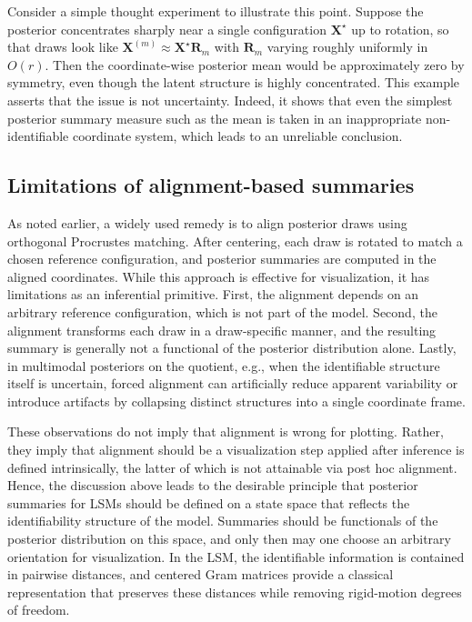 \documentclass[12pt]{article}
\newcommand{\bfR}{\boldsymbol{R}}
\newcommand{\bfX}{\boldsymbol{X}}
\begin{document}
Consider a simple thought experiment to illustrate this point. Suppose the posterior concentrates sharply near a
single configuration $\bfX^\star$ up to rotation, so that draws look like $\bfX^{(m)}\approx \bfX^\star \bfR_m$
with $\bfR_m$ varying roughly uniformly in $O(r)$. Then the coordinate-wise posterior mean would be approximately zero by symmetry, even though the latent structure is highly concentrated. This example asserts that the issue is not uncertainty. Indeed, it shows that even the simplest posterior summary measure such as the mean is taken in an inappropriate non-identifiable coordinate system, which leads to an unreliable conclusion.

\subsection{Limitations of alignment-based summaries}

As noted earlier, a widely used remedy is to align posterior draws using orthogonal Procrustes matching. After centering, each draw is rotated to match a chosen reference configuration, and posterior summaries
are computed in the aligned coordinates. While this approach is  effective for visualization, it has limitations as an inferential
primitive. First, the alignment depends on an arbitrary reference configuration, which is not part of the model. Second, the alignment transforms each draw in a draw-specific manner, and the resulting summary
is generally not a functional of the posterior distribution alone. Lastly, in multimodal posteriors on the quotient, e.g., when the identifiable structure itself is
uncertain, forced alignment can artificially reduce apparent variability or introduce artifacts by
collapsing distinct structures into a single coordinate frame. 

These observations do not imply that alignment is wrong for plotting. Rather, they imply that alignment should be a visualization step applied after inference is defined intrinsically, the latter of which is not attainable via post hoc alignment. Hence, the discussion above leads to the desirable principle that posterior summaries for LSMs should be defined on a state space that reflects the identifiability
structure of the model. Summaries should be functionals of the posterior distribution on this space,
and only then may one choose an arbitrary orientation for visualization. In the LSM, the identifiable information is contained in pairwise distances, and centered Gram
matrices provide a classical representation that preserves these distances while removing rigid-motion degrees of freedom.
\end{document}
